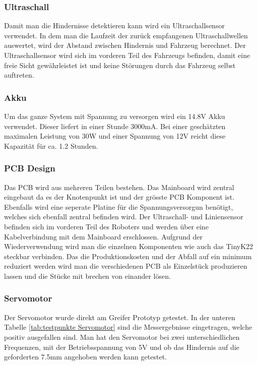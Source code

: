 \subsubsection{Ultraschall}

Damit man die Hindernisse detektieren kann wird ein Ultraschallsensor verwendet. In dem man die Laufzeit der zurück empfangenen Ultraschallwellen auswertet, wird der Abstand zwischen Hindernis und Fahrzeug berechnet. Der Ultraschallsensor wird sich im vorderen Teil des Fahrzeugs befinden, damit eine freie Sicht gewährleistet ist und keine Störungen durch das Fahrzeug selbst auftreten.

\subsubsection{Akku}

Um das ganze System mit Spannung zu versorgen wird ein 14.8V Akku verwendet. Dieser liefert in einer Stunde 3000mA. Bei einer geschätzten maximalen Leistung von 30W und einer Spannung von 12V reicht diese Kapazität für ca. 1.2 Stunden. 



\subsubsection{PCB Design}

Das PCB wird aus mehreren Teilen bestehen. Das Mainboard wird zentral eingebaut da es der Knotenpunkt ist und der grösste PCB Komponent ist. Ebenfalls wird eine seperate Platine für die Spannungsversorgun benötigt, welches sich ebenfall zentral befinden wird. Der Ultraschall- und Liniensensor befinden sich im vorderen Teil des Roboters und werden über eine Kabelverbindung mit dem Mainboard erschlossen. Aufgrund der Wiederverwendung wird man die einzelnen Komponenten wie auch das TinyK22 steckbar verbinden. Das die Produktionskosten und der Abfall auf ein minimum reduziert werden wird man die verschiedenen PCB als Einzelstück produzieren lassen und die Stücke mit brechen von einander lösen.



\subsubsection{Servomotor}

Der Servomotor wurde direkt am Greifer Prototyp getestet. In der unteren Tabelle \ref{tab:testpunkte Servomotor} sind die Messergebnisse eingetragen, welche positiv ausgefallen sind. Man hat den Servomotor bei zwei unterschiedlichen Frequenzen, mit der Betriebsspannung von 5V und ob das Hindernis auf die geforderten 7.5mm angehoben werden kann getestet.


